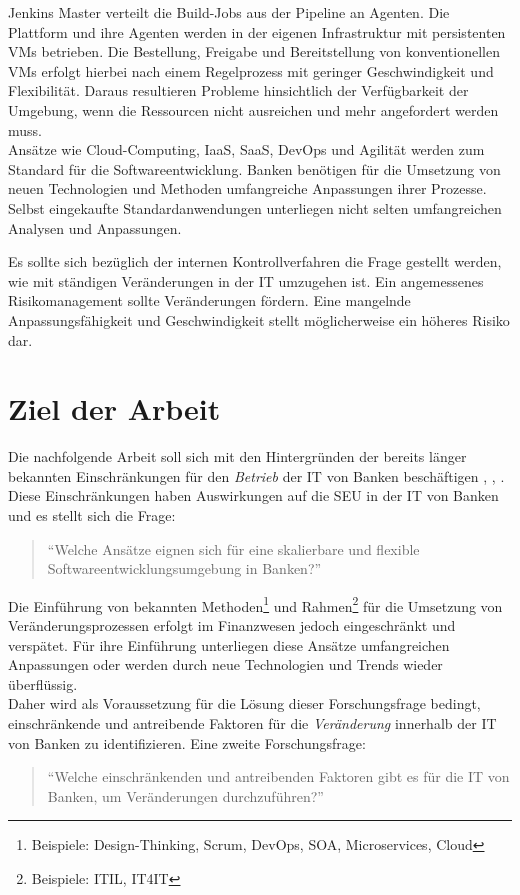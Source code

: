 Jenkins Master verteilt die Build-Jobs aus der Pipeline an Agenten. Die Plattform und ihre Agenten werden in der eigenen Infrastruktur mit persistenten \ac{VMs} betrieben. Die Bestellung, Freigabe und Bereitstellung von konventionellen \ac{VMs} erfolgt hierbei nach einem Regelprozess\cite{MaRisk:2017} mit geringer Geschwindigkeit und Flexibilität. Daraus resultieren Probleme hinsichtlich der Verfügbarkeit der Umgebung, wenn die Ressourcen nicht ausreichen und mehr angefordert werden muss.
\medskip
\\
Ansätze wie Cloud-Computing, \ac{IaaS}, \ac{SaaS}, DevOps und Agilität werden zum Standard für die Softwareentwicklung. Banken benötigen für die Umsetzung von neuen Technologien und Methoden umfangreiche Anpassungen ihrer Prozesse. Selbst eingekaufte Standardanwendungen unterliegen nicht selten umfangreichen Analysen und Anpassungen. 

Es sollte sich bezüglich der internen Kontrollverfahren die Frage gestellt werden, wie mit ständigen Veränderungen in der IT umzugehen ist. Ein angemessenes Risikomanagement sollte Veränderungen fördern. Eine mangelnde Anpassungsfähigkeit und Geschwindigkeit stellt möglicherweise ein höheres Risiko dar.
%
%
\section{Ziel der Arbeit}
\label{sec:intro:goal}

Die nachfolgende Arbeit soll sich mit den Hintergründen der bereits länger bekannten Einschränkungen für den \emph{Betrieb} der IT von Banken beschäftigen \cite{Brockhoff2006},  \cite{Bussmann2006}, \cite{Gupta:2017}.
Diese Einschränkungen haben Auswirkungen auf die \ac{SEU} in der IT von Banken und es stellt sich die Frage:
\begin{quote}
    \enquote{Welche Ansätze eignen sich für eine skalierbare und flexible Softwareentwicklungsumgebung in Banken?}
\end{quote}
%
Die Einführung von bekannten Methoden\footnote{Beispiele: Design-Thinking, Scrum, DevOps, \ac{SOA}, Microservices, Cloud} und Rahmen\footnote{Beispiele: ITIL, IT4IT} für die Umsetzung von Veränderungsprozessen erfolgt im Finanzwesen jedoch eingeschränkt und verspätet. Für ihre Einführung unterliegen diese Ansätze umfangreichen Anpassungen oder werden durch neue Technologien und Trends wieder überflüssig.
\medskip
\\
Daher wird als Voraussetzung für die Lösung dieser Forschungsfrage bedingt, einschränkende und antreibende Faktoren für die \emph{Veränderung} innerhalb der IT von Banken zu identifizieren. Eine zweite Forschungsfrage:
\begin{quote}
    \enquote{Welche einschränkenden und antreibenden Faktoren gibt es für die IT von Banken, um Veränderungen durchzuführen?}
\end{quote}

